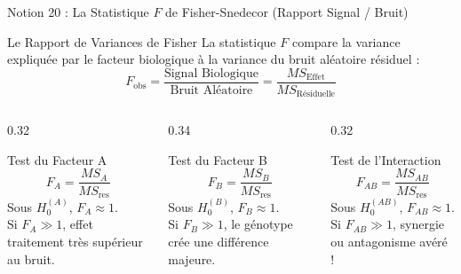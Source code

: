 \documentclass[aspectratio=169,10pt]{beamer}
\begin{document}
\begin{frame}{Notion 20 : La Statistique $F$ de Fisher-Snedecor (Rapport Signal / Bruit)}
  \begin{conceptbox}{Le Rapport de Variances de Fisher}
    La statistique $F$ compare la variance expliquée par le facteur biologique à la variance du bruit aléatoire résiduel :
    \begin{equation*}
      F_{\text{obs}} = \frac{\text{Signal Biologique}}{\text{Bruit Aléatoire}} = \frac{MS_{\text{Effet}}}{MS_{\text{Résiduelle}}}
    \end{equation*}
  \end{conceptbox}

  \begin{columns}[onlytextwidth, T]
    \begin{column}{0.32\linewidth}
      \begin{conceptbox}{Test du Facteur A}
        \begin{equation*}
          F_A = \frac{MS_A}{MS_{\text{res}}}
        \end{equation*}
        Sous $H_0^{(A)}$, $F_A \approx 1$.\\
        Si $F_A \gg 1$, effet traitement très supérieur au bruit.
      \end{conceptbox}
    \end{column}
    \begin{column}{0.34\linewidth}
      \begin{conceptbox}{Test du Facteur B}
        \begin{equation*}
          F_B = \frac{MS_B}{MS_{\text{res}}}
        \end{equation*}
        Sous $H_0^{(B)}$, $F_B \approx 1$.\\
        Si $F_B \gg 1$, le génotype crée une différence majeure.
      \end{conceptbox}
    \end{column}
    \begin{column}{0.32\linewidth}
      \begin{conceptbox}{Test de l'Interaction}
        \begin{equation*}
          F_{AB} = \frac{MS_{AB}}{MS_{\text{res}}}
        \end{equation*}
        Sous $H_0^{(AB)}$, $F_{AB} \approx 1$.\\
        Si $F_{AB} \gg 1$, synergie ou antagonisme avéré !
      \end{conceptbox}
    \end{column}
  \end{columns}
\end{frame}
\end{document}
